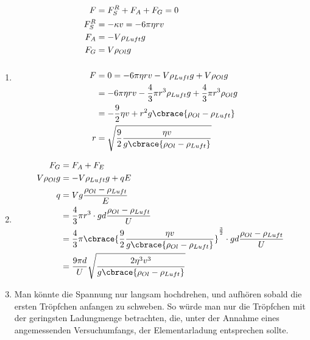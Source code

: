\documentclass[11pt,letterpaper]{article}
\begin{document}
\begin{enumerate}
\begin{enumerate}
            \item
            \begin{align*}
                F &= F_S^R + F_A +F_G = 0\\
                F_S^R &= -\kappa v = - 6\pi \eta r v\\
                F_A &= -V \rho_{Luft} g\\
                F_G &= V \rho_{Ol} g\\
                \\
                F &= 0 = - 6\pi \eta r v
                - V \rho_{Luft} g
                + V \rho_{Ol} g\\ 
                &= - 6\pi \eta r v
                - \frac{4}{3}\pi r^3 \rho_{Luft} g
                + \frac{4}{3}\pi r^3 \rho_{Ol} g\\
                &= - \frac{9}{2} \eta  v
                +  r^2 g \cbrace{\rho_{Ol} - \rho_{Luft} } \\ 
                r &= \sqrt{\frac{9}{2} \frac{\eta  v}{ g \cbrace{\rho_{Ol} - \rho_{Luft} }} }\\ 
             \end{align*}

            \item
            \begin{align*}
                F_G &=  F_A + F_E\\
                V \rho_{Ol} g &= -V\rho_{Luft} g + q E\\
                q &= V g\frac{\rho_{Ol} - \rho_{Luft}}{E}\\
                &= \frac{4}{3}\pi r^3 \cdot g d \frac{\rho_{Ol} - \rho_{Luft}}{U}\\
                &= \frac{4}{3}\pi \cbrace{\frac{9}{2} \frac{\eta  v}{ g \cbrace{\rho_{Ol} - \rho_{Luft} }} }^{\frac{3}{2}} \cdot g d \frac{\rho_{Ol} - \rho_{Luft}}{U}\\
                &= \frac{9\pi d }{U} \sqrt{ \frac{2 \eta^3  v^3}{ g \cbrace{\rho_{Ol} - \rho_{Luft} }} }\\
            \end{align*}

            \item
            Man könnte die Spannung nur langsam hochdrehen, und aufhören sobald
            die ersten Tröpfchen anfangen zu schweben. So würde man nur die Tröpfchen
            mit der geringsten Ladungmenge betrachten, die, unter der 
            Annahme eines angemessenden Versuchumfangs, der Elementarladung
            entsprechen sollte. 

        \end{enumerate}
\end{enumerate}
\end{document}
